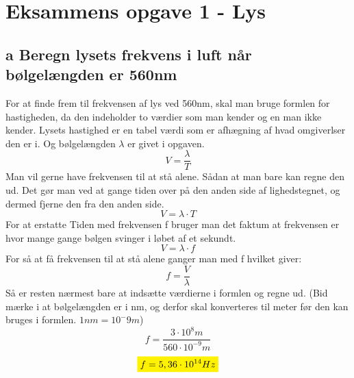 \newpage 
\section{Eksammens opgave 1 - Lys}\label{sec:eks1}
\subsection{a Beregn lysets frekvens i luft når bølgelængden er 560nm}
For at finde frem til frekvensen af lys ved 560nm, skal man bruge formlen for hastigheden, da den indeholder to værdier som man kender og en man ikke kender. Lysets hastighed er en tabel værdi som er afhægning af hvad omgiverlser den er i. Og bølgelængden \begin{math}\lambda\end{math} er givet i opgaven.
\begin{equation*}
    V=\frac{\lambda}{T}
\end{equation*}
Man vil gerne have frekvensen til at stå alene. Sådan at man bare kan regne den ud. Det gør man ved at gange tiden over på den anden side af lighedstegnet, og dermed fjerne den fra den anden side. 
\begin{equation*}
    V=\lambda\cdot T
\end{equation*}
For at erstatte Tiden med frekvensen f bruger man det faktum at frekvensen er hvor mange gange bølgen svinger i løbet af et sekundt.
\begin{equation*}
    V=\lambda \cdot f 
\end{equation*}
For så at få frekvensen til at stå alene ganger man med f hvilket giver:
\begin{equation*}
    f=\frac{V}{\lambda}
\end{equation*}
Så er resten nærmest bare at indsætte værdierne i formlen og regne ud. (Bid mærke i at bølgelængden er i nm, og derfor skal konverteres til meter før den kan bruges i formlen. \begin{math}1 nm=10^-9m\end{math})
\begin{equation*}
    f=\frac{3 \cdot 10^8 m}{560 \cdot 10^{-9} m}
\end{equation*}
\textbf{\begin{equation*}
    \mathcolorbox{yellow}{f=5,36 \cdot 10^{14} Hz}
\end{equation*}}
